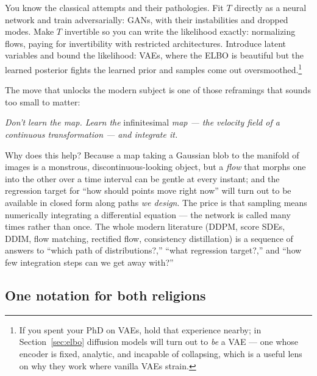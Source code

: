 \documentclass[10pt,a4paper]{article}
\begin{document}
You know the classical attempts and their pathologies. Fit $T$ directly as
a neural network and train adversarially: GANs, with their instabilities
and dropped modes. Make $T$ invertible so you can write the likelihood
exactly: normalizing flows, paying for invertibility with restricted
architectures. Introduce latent variables and bound the likelihood: VAEs,
where the ELBO is beautiful but the learned posterior fights the learned
prior and samples come out oversmoothed.\footnote{If you spent your PhD on
VAEs, hold that experience nearby; in Section~\ref{sec:elbo} diffusion
models will turn out to \emph{be} a VAE --- one whose encoder is fixed,
analytic, and incapable of collapsing, which is a useful lens on why they
work where vanilla VAEs strain.}

The move that unlocks the modern subject is one of those reframings that
sounds too small to matter:

\begin{center}
\emph{Don't learn the map. Learn the} infinitesimal \emph{map ---
the velocity field of a continuous transformation --- and integrate it.}
\end{center}

Why does this help? Because a map taking a Gaussian blob to the manifold of
images is a monstrous, discontinuous-looking object, but a \emph{flow} that
morphs one into the other over a time interval can be gentle at every
instant; and the regression target for ``how should points move right now''
will turn out to be available in closed form along paths \emph{we design}.
The price is that sampling means numerically integrating a differential
equation --- the network is called many times rather than once. The whole
modern literature (DDPM, score SDEs, DDIM, flow matching, rectified flow,
consistency distillation) is a sequence of answers to ``which path of
distributions?,'' ``what regression target?,'' and ``how few integration
steps can we get away with?''

\subsection{One notation for both religions}
\end{document}
